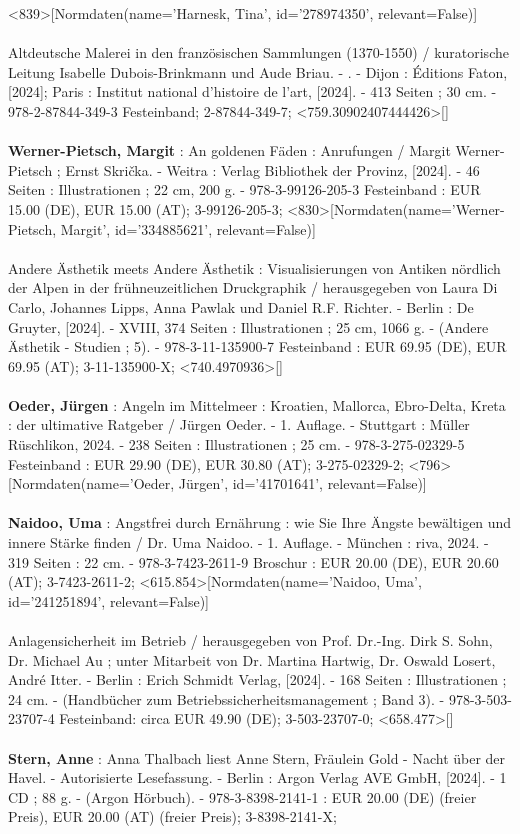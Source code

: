 \documentclass{article}
\begin{document}
\begin{multicols}{3}
<839>[Normdaten(name='Harnesk, Tina', id='278974350', relevant=False)]\\\\Altdeutsche Malerei in den französischen Sammlungen (1370-1550) / kuratorische Leitung Isabelle Dubois-Brinkmann und Aude Briau. - . - Dijon : Éditions Faton, [2024]; Paris : Institut national d'histoire de l'art, [2024]. - 413 Seiten ; 30 cm. - 978-2-87844-349-3 Festeinband; 2-87844-349-7; <759.30902407444426>[]\\\\\textbf{Werner-Pietsch, Margit} : An goldenen Fäden : Anrufungen / Margit Werner-Pietsch ; Ernst Skrička. - Weitra : Verlag Bibliothek der Provinz, [2024]. - 46 Seiten : Illustrationen ; 22 cm, 200 g. - 978-3-99126-205-3 Festeinband : EUR 15.00 (DE), EUR 15.00 (AT); 3-99126-205-3; <830>[Normdaten(name='Werner-Pietsch, Margit', id='334885621', relevant=False)]\\\\Andere Ästhetik meets Andere Ästhetik : Visualisierungen von Antiken nördlich der Alpen in der frühneuzeitlichen Druckgraphik / herausgegeben von Laura Di Carlo, Johannes Lipps, Anna Pawlak und Daniel R.F. Richter. - Berlin : De Gruyter, [2024]. - XVIII, 374 Seiten : Illustrationen ; 25 cm, 1066 g. - (Andere Ästhetik - Studien ; 5). - 978-3-11-135900-7 Festeinband : EUR 69.95 (DE), EUR 69.95 (AT); 3-11-135900-X; <740.4970936>[]\\\\\textbf{Oeder, Jürgen} : Angeln im Mittelmeer : Kroatien, Mallorca, Ebro-Delta, Kreta : der ultimative Ratgeber / Jürgen Oeder. - 1. Auflage. - Stuttgart : Müller Rüschlikon, 2024. - 238 Seiten : Illustrationen ; 25 cm. - 978-3-275-02329-5 Festeinband : EUR 29.90 (DE), EUR 30.80 (AT); 3-275-02329-2; <796>[Normdaten(name='Oeder, Jürgen', id='41701641', relevant=False)]\\\\\textbf{Naidoo, Uma} : Angstfrei durch Ernährung : wie Sie Ihre Ängste bewältigen und innere Stärke finden / Dr. Uma Naidoo. - 1. Auflage. - München : riva, 2024. - 319 Seiten : 22 cm. - 978-3-7423-2611-9 Broschur : EUR 20.00 (DE), EUR 20.60 (AT); 3-7423-2611-2; <615.854>[Normdaten(name='Naidoo, Uma', id='241251894', relevant=False)]\\\\Anlagensicherheit im Betrieb / herausgegeben von Prof. Dr.-Ing. Dirk S. Sohn, Dr. Michael Au ; unter Mitarbeit von Dr. Martina Hartwig, Dr. Oswald Losert, André Itter. - Berlin : Erich Schmidt Verlag, [2024]. - 168 Seiten : Illustrationen ; 24 cm. - (Handbücher zum Betriebssicherheitsmanagement ; Band 3). - 978-3-503-23707-4 Festeinband: circa EUR 49.90 (DE); 3-503-23707-0; <658.477>[]\\\\\textbf{Stern, Anne} : Anna Thalbach liest Anne Stern, Fräulein Gold - Nacht über der Havel. - Autorisierte Lesefassung. - Berlin : Argon Verlag AVE GmbH, [2024]. - 1 CD ; 88 g. - (Argon Hörbuch). - 978-3-8398-2141-1 : EUR 20.00 (DE) (freier Preis), EUR 20.00 (AT) (freier Preis); 3-8398-2141-X; 
\end{multicols}
\end{document}
